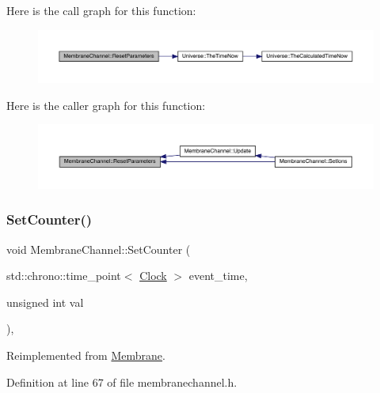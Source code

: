 Here is the call graph for this function\+:\nopagebreak
\begin{figure}[H]
\begin{center}
\leavevmode
\includegraphics[width=350pt]{class_membrane_channel_a5982040b46efe5e2b824d1cf4dead25e_cgraph}
\end{center}
\end{figure}
Here is the caller graph for this function\+:\nopagebreak
\begin{figure}[H]
\begin{center}
\leavevmode
\includegraphics[width=350pt]{class_membrane_channel_a5982040b46efe5e2b824d1cf4dead25e_icgraph}
\end{center}
\end{figure}
\mbox{\label{class_membrane_channel_a61931feff8f3bb485eeb5c80125bb732}} 
\subsubsection{\texorpdfstring{Set\+Counter()}{SetCounter()}}
{\footnotesize\ttfamily void Membrane\+Channel\+::\+Set\+Counter (\begin{DoxyParamCaption}\item[{std\+::chrono\+::time\+\_\+point$<$ \hyperlink{universe_8h_a0ef8d951d1ca5ab3cfaf7ab4c7a6fd80}{Clock} $>$}]{event\+\_\+time,  }\item[{unsigned int}]{val }\end{DoxyParamCaption})\hspace{0.3cm}{\ttfamily [inline]}, {\ttfamily [virtual]}}



Reimplemented from \hyperlink{class_membrane_a4bff43b38d7046867f220392a39cc272}{Membrane}.



Definition at line 67 of file membranechannel.\+h.

